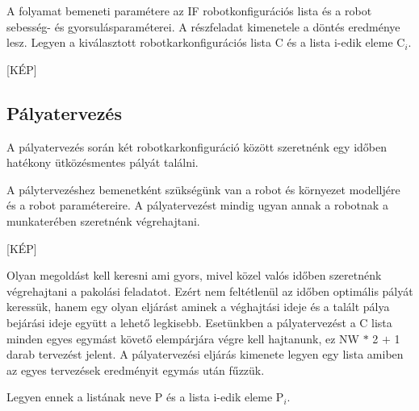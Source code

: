 A folyamat bemeneti paramétere az IF robotkonfigurációs lista és a robot sebesség- és gyorsulásparaméterei.
A részfeladat kimenetele a döntés eredménye lesz. Legyen a kiválasztott robotkarkonfigurációs lista C és a lista i-edik eleme C$_i$.
 




[KÉP]


\subsection{Pályatervezés}
A pályatervezés során két robotkarkonfiguráció között szeretnénk egy időben hatékony ütközésmentes pályát találni. 

A pálytervezéshez bemenetként szükségünk van a robot és környezet modelljére és a robot paramétereire. A pályatervezést mindig ugyan annak a robotnak a munkaterében szeretnénk végrehajtani. 

[KÉP]

Olyan megoldást kell keresni ami gyors, mivel közel valós időben szeretnénk végrehajtani a pakolási feladatot. Ezért nem feltétlenül az időben optimális pályát keressük, hanem egy olyan eljárást aminek a véghajtási ideje és a talált pálya bejárási ideje együtt a lehető legkisebb. Esetünkben a pályatervezést a C lista minden egyes egymást követő elempárjára végre kell hajtanunk, ez NW $*$ 2 $+$ 1 darab tervezést jelent. A pályatervezési eljárás kimenete legyen egy lista amiben az egyes tervezések eredményit egymás után fűzzük.

Legyen ennek a listának neve P és a lista i-edik eleme P$_i$.